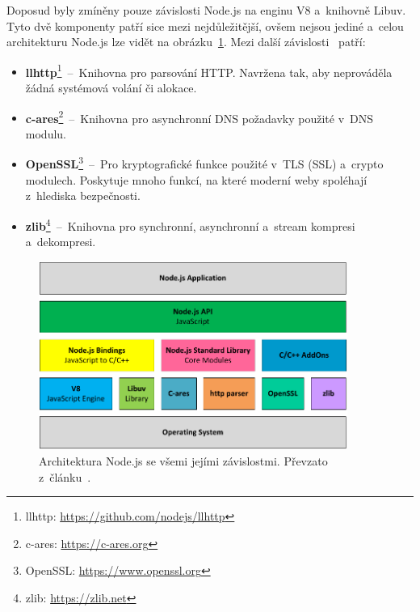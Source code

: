 Doposud byly zmíněny pouze závislosti Node.js na enginu V8 a~knihovně Libuv. Tyto dvě komponenty patří sice mezi nejdůležitější, ovšem nejsou jediné a~celou architekturu Node.js lze vidět na obrázku~\ref{img:Node.js architektura}. Mezi další závislosti~\cite{website:NodeJSArchitectureAndConcurrencyModel} patří:
\begin{itemize}
    \item \textbf{llhttp}\footnote{llhttp: \url{https://github.com/nodejs/llhttp}}~--~Knihovna pro parsování HTTP. Navržena tak, aby neprováděla žádná systémová volání či alokace.
    \item \textbf{c-ares}\footnote{c-ares: \url{https://c-ares.org}}~--~Knihovna pro asynchronní DNS požadavky použité v~DNS modulu.
    \item \textbf{OpenSSL}\footnote{OpenSSL: \url{https://www.openssl.org}}~--~Pro kryptografické funkce použité v~TLS (SSL) a~crypto modulech. Poskytuje mnoho funkcí, na které moderní weby spoléhají z~hlediska bezpečnosti.
    \item \textbf{zlib}\footnote{zlib: \url{https://zlib.net}}~--~Knihovna pro synchronní, asynchronní a~stream kompresi a~dekompresi.
\end{itemize}

\begin{figure}[hbt]
	\centering
	\setlength{\fboxsep}{0pt}
	\includegraphics[width=0.9\textwidth]{obrazky-figures/NodeArchitecture.pdf}
	\caption{Architektura Node.js se všemi jejími závislostmi. Převzato z~článku~\cite{website:NodeJSArchitectureAndConcurrencyModel}.}
	\label{img:Node.js architektura}
\end{figure}

